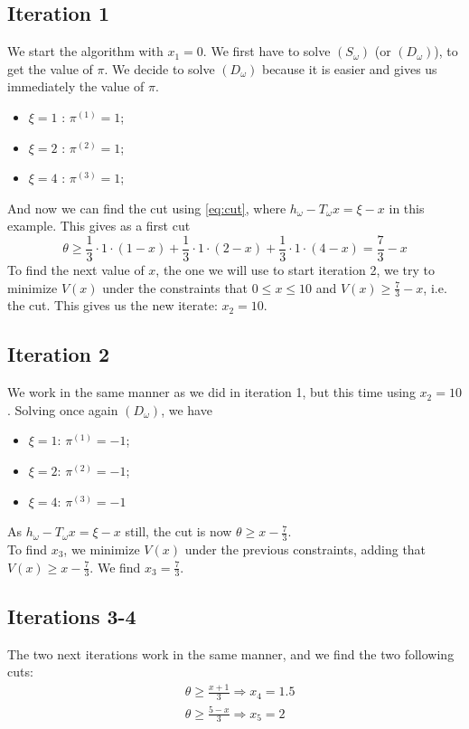 \documentclass[12pt, openany]{report}
\theoremstyle{definition}
\begin{document}
\subsection{Iteration 1}
We start the algorithm with $x_1 = 0$. We first have to solve $(S_\omega)$ (or $(D_\omega)$), to get the value of $\pi$. We decide to solve $(D_\omega)$ because it is easier and gives us immediately the value of $\pi$. 
\begin{itemize}
	\item $\xi=1$ : $\pi^{(1)} = 1$;
	\item $\xi=2$ : $\pi^{(2)} = 1$;
	\item $\xi=4$ : $\pi^{(3)} = 1$;
\end{itemize}
And now we can find the cut using \eqref{eq:cut}, where $h_\omega - T_\omega x=\xi-x$ in this example. This gives as a first cut
\begin{equation}
	\theta \ge \frac{1}{3}\cdot 1 \cdot (1-x) + \frac{1}{3}\cdot 1 \cdot (2-x) + \frac{1}{3}\cdot 1 \cdot (4-x) = \frac{7}{3}-x
\end{equation}
To find the next value of $x$, the one we will use to start iteration 2, we try to minimize $V(x)$ under the constraints that $0\le x\le 10$ and $V(x) \ge \frac{7}{3}-x$, i.e. the cut. This gives us the new iterate: $x_2 = 10$. 
\subsection{Iteration 2}
We work in the same manner as we did in iteration 1, but this time using $x_2=10$. Solving once again $(D_\omega)$, we have 
\begin{itemize}
	\item $\xi = 1$: $\pi^{(1)} = -1$;
	\item $\xi = 2$: $\pi^{(2)} = -1$;
	\item $\xi = 4$: $\pi^{(3)} = -1$
\end{itemize}
As $h_\omega -T_\omega x= \xi-x$ still, the cut is now $\theta \ge x-\frac{7}{3}$.\\
To find $x_3$, we minimize $V(x)$ under the previous constraints, adding that $V(x) \ge x-\frac{7}{3}$. We find $x_3 = \frac{7}{3}$. 
\subsection{Iterations 3-4}
The two next iterations work in the same manner, and we find the two following cuts:
\begin{equation}
	\begin{aligned}
		&\theta \ge \frac{x+1}{3} \Longrightarrow x_4 = 1.5\\
		& \theta \ge \frac{5-x}{3} \Longrightarrow x_5 = 2\\
	\end{aligned}
\end{equation}
\end{document}
